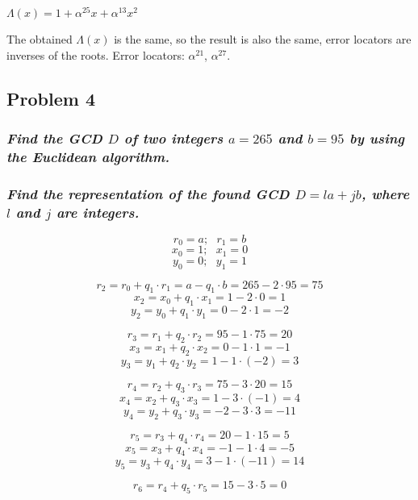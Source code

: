 \documentclass[11pt]{article}
\begin{document}
\(Λ(x) = 1 + α^{25}x + α^{13}x^2\)

The obtained \(Λ(x)\) is the same, so the result is also the same, error
locators are inverses of the roots. Error locators: \(α^{21}\),
\(α^{27}\).

    \hypertarget{problem-4}{%
\subsection{Problem 4}\label{problem-4}}

    \hypertarget{find-the-gcd-d-of-two-integers-a-265-and-b-95-by-using-the-euclidean-algorithm.}{%
\subsubsection{\texorpdfstring{\emph{Find the GCD \(D\) of two integers
\(a = 265\) and \(b = 95\) by using the Euclidean
algorithm.}}{Find the GCD D of two integers a = 265 and b = 95 by using the Euclidean algorithm.}}\label{find-the-gcd-d-of-two-integers-a-265-and-b-95-by-using-the-euclidean-algorithm.}}

\hypertarget{find-the-representation-of-the-found-gcd-d-la-jb-where-l-and-j-are-integers.}{%
\subsubsection{\texorpdfstring{\emph{Find the representation of the
found GCD \(D = la + jb\), where \(l\) and \(j\) are
integers.}}{Find the representation of the found GCD D = la + jb, where l and j are integers.}}\label{find-the-representation-of-the-found-gcd-d-la-jb-where-l-and-j-are-integers.}}

    \[r_0 = a; \text{ }r_1 = b\] \[x_0 = 1; \text{ }x_1 = 0\]
\[y_0 = 0; \text{ }y_1 = 1\]

\[r_2 = r_0 + q_1⋅r_1 = a - q_1⋅b = 265 - 2 ⋅95 = 75\]
\[x_2 = x_0 + q_1⋅x_1 = 1 - 2⋅0 =1\]
\[y_2 = y_0 + q_1⋅y_1 = 0 - 2⋅1 =-2\]

\[r_3 = r_1 + q_2⋅r_2 = 95 - 1 ⋅75 = 20\]
\[x_3 = x_1 + q_2⋅x_2 = 0 - 1⋅1 =-1\]
\[y_3 = y_1 + q_2⋅y_2 = 1 - 1⋅(-2) =3\]

\[r_4 = r_2 + q_3⋅r_3 = 75 - 3 ⋅20 = 15\]
\[x_4 = x_2 + q_3⋅x_3 = 1 - 3⋅(-1) =4\]
\[y_4 = y_2 + q_3⋅y_3 = -2 - 3⋅3 = -11\]

\[r_5 = r_3 + q_4⋅r_4 = 20 - 1⋅15 = 5\]
\[x_5 = x_3 + q_4⋅x_4 = -1-1⋅4 = -5\]
\[y_5 = y_3 + q_4⋅y_4 = 3-1⋅(-11)=14\]

\[r_6 = r_4 + q_5⋅r_5 = 15 - 3⋅5 = 0\]
\end{document}

